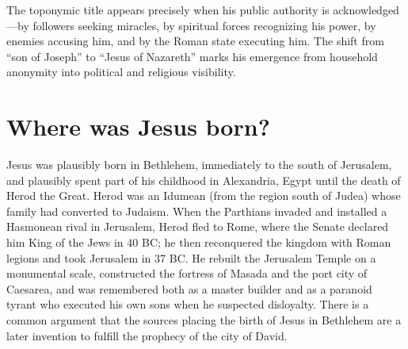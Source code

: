 The toponymic title appears precisely when his public authority is acknowledged---by followers seeking miracles, by spiritual forces recognizing his power, by enemies accusing him, and by the Roman state executing him.
The shift from ``son of Joseph'' to ``Jesus of Nazareth'' marks his emergence from household anonymity into political and religious visibility.

\section{Where was Jesus born?}\label{sec:where-was-jesus-born}
Jesus was plausibly born in Bethlehem, immediately to the south of Jerusalem, and plausibly spent part of his childhood in Alexandria, Egypt until the death of Herod the Great.
Herod was an Idumean (from the region south of Judea) whose family had converted to Judaism.
When the Parthians invaded and installed a Hasmonean rival in Jerusalem, Herod fled to Rome, where the Senate declared him King of the Jews in 40 BC; he then reconquered the kingdom with Roman legions and took Jerusalem in 37 BC.
He rebuilt the Jerusalem Temple on a monumental scale, constructed the fortress of Masada and the port city of Caesarea, and was remembered both as a master builder and as a paranoid tyrant who executed his own sons when he suspected disloyalty.
There is a common argument that the sources placing the birth of Jesus in Bethlehem are a later invention to fulfill the prophecy of the city of David.

